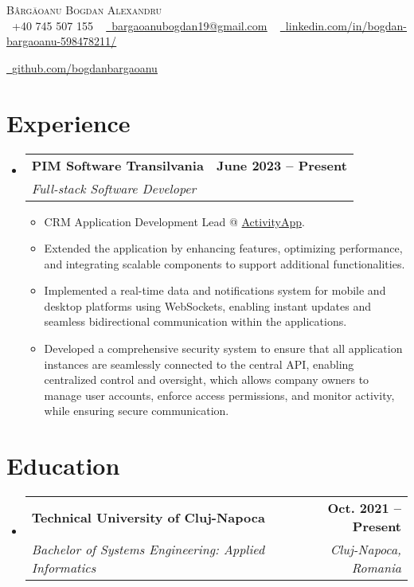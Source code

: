 \documentclass[letterpaper,11pt]{article}
\makeatletter
\newcommand{\resumeItem}[1]{
  \item\small{
    {#1 \vspace{-2pt}}
  }
}
\newcommand{\resumeSubheading}[4]{
  \vspace{-2pt}\item
    \begin{tabular*}{1.0\textwidth}[t]{l@{\extracolsep{\fill}}r}
      \textbf{#1} & \textbf{\small #2} \\
      \textit{\small#3} & \textit{\small #4} \\
    \end{tabular*}\vspace{-7pt}
}
\newcommand{\resumeSubHeadingListStart}{\begin{itemize}[leftmargin=0.0in, label={}]}
\newcommand{\resumeSubHeadingListEnd}{\end{itemize}}
\newcommand{\resumeItemListStart}{\begin{itemize}}
\newcommand{\resumeItemListEnd}{\end{itemize}\vspace{-5pt}}
\makeatother
\begin{document}
\begin{center}
    {\Huge \scshape Bârgăoanu Bogdan Alexandru} \\ \vspace{1pt}
    \small \raisebox{-0.1\height}\faPhone\ +40 745 507 155 ~ 
    \href{mailto:x@gmail.com}{\raisebox{-0.2\height}\faEnvelope\  \underline{bargaoanubogdan19@gmail.com}} ~ 
    \href{https://linkedin.com/in//}{\raisebox{-0.2\height}\faLinkedin\ \underline{linkedin.com/in/bogdan-bargaoanu-598478211/}}  ~
    
    \href{https://github.com/bogdanbargaoanu}{\raisebox{-0.2\height}\faGithub\ \underline{github.com/bogdanbargaoanu}}
    \vspace{-8pt}
\end{center}
\section{Experience}
  \resumeSubHeadingListStart
   \resumeSubheading
      {PIM Software Transilvania}{June 2023 -- Present}
      {Full-stack Software Developer}{}
      \resumeItemListStart
        \resumeItem{CRM Application Development Lead @ \href{https://pimsoftware.ro/activityapp/}{ActivityApp}.}
        \resumeItem{Extended the application by enhancing features, optimizing performance, and integrating scalable components to support additional functionalities.}
        \resumeItem{ Implemented a real-time data and notifications system for mobile and desktop platforms using WebSockets, enabling instant updates and seamless bidirectional communication within the applications.}
        \resumeItem{ Developed a comprehensive security system to ensure that all application instances are seamlessly connected to the central API, enabling centralized control and oversight, which allows company owners to manage user accounts, enforce access permissions, and monitor activity, while ensuring secure communication.}
      \resumeItemListEnd
  \resumeSubHeadingListEnd
\vspace{-16pt}

\section{Education}
  \resumeSubHeadingListStart
    \resumeSubheading
      {Technical University of Cluj-Napoca}{Oct. 2021 -- Present}
      {Bachelor of Systems Engineering: Applied Informatics}{Cluj-Napoca, Romania}
  \resumeSubHeadingListEnd
  
\end{document}
